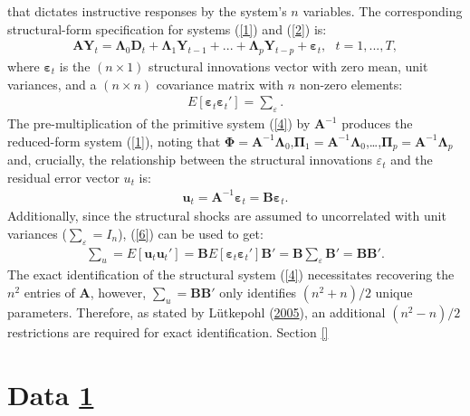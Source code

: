 \documentclass[11pt,preprint, authoryear]{elsarticle}
\numberwithin{equation}{section}
\numberwithin{figure}{section}
\numberwithin{table}{section}
\begin{document}
that dictates instructive responses by the system's \(n\) variables. The
corresponding structural-form specification for systems (\ref{1}) and
(\ref{2}) is: \begin{align}
\bm{AY}_t = \bm{\Lambda}_0 \bm{D}_t + \bm{\Lambda}_1 \bm{Y}_{t-1} + ...+ \bm{\Lambda}_p \bm{Y}_{t-p} + \bm{\varepsilon}_t, \ \ \ t=1,...,T,  \label{4}
\end{align} where \(\bm{\varepsilon}_t\) is the \((n \times 1)\)
structural innovations vector with zero mean, unit variances, and a
\((n \times n)\) covariance matrix with \(n\) non-zero elements:
\begin{align}
E[ \bm{\varepsilon}_t \bm{\varepsilon}_t'] = \sum_{\varepsilon}. \label{5}
\end{align} The pre-multiplication of the primitive system (\ref{4}) by
\(\bm{A}^{-1}\) produces the reduced-form system (\ref{1}), noting that
\(\bm{\Phi} =\bm{A}^{-1} \bm{\Lambda}_0\),\(\bm{\Pi}_1 = \bm{A}^{-1} \bm{\Lambda}_0\),\ldots,\(\bm{\Pi}_p = \bm{A}^{-1} \bm{\Lambda}_p\)
and, crucially, the relationship between the structural innovations
\(\varepsilon_t\) and the residual error vector \(u_t\) is:
\begin{align}
\bm{u}_t = \bm{A}^{-1} \bm{\varepsilon}_t = \bm{B} \bm{\varepsilon}_t. \label{6}
\end{align} Additionally, since the structural shocks are assumed to
uncorrelated with unit variances (\(\sum_{\varepsilon} = I_n\)),
(\ref{6}) can be used to get: \begin{align}
\sum_u = E[\bm{u}_t \bm{u}_t'] = \bm{B} E[\bm{\varepsilon}_t \bm{\varepsilon}_t'] \bm{B'} =  \bm{B} \sum_{\varepsilon} \bm{B'} = \bm{BB'}. \label{7}
\end{align} The exact identification of the structural system (\ref{4})
necessitates recovering the \(n^2\) entries of \(\bm{A}\), however,
\(\sum_u = \bm{BB'}\) only identifies \((n^2 +n)/2\) unique parameters.
Therefore, as stated by Lütkepohl
(\protect\hyperlink{ref-lutkepohl2005}{2005}), an additional
\((n^2 -n)/2\) restrictions are required for exact identification.
Section \ref{}

\hypertarget{data}{%
\section{\texorpdfstring{Data \ref{data}}{Data }}\label{data}}
\end{document}
